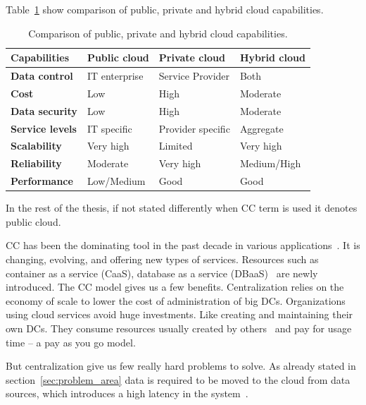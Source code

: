 Table~\ref{tab:table4} show comparison of public, private and hybrid cloud capabilities.

\begin{table}[h!]
	\begin{center}
		\begin{tabular}{l|l|l|l}
			\textbf{Capabilities} & \textbf{Public cloud} & \textbf{Private cloud} & \textbf{Hybrid cloud}\\
			\hline
			\textbf{Data control} & IT enterprise & Service Provider & Both \\
			\textbf{Cost} & Low & High & Moderate \\
			\textbf{Data security} & Low & High & Moderate \\
			\textbf{Service levels} & IT specific & Provider specific & Aggregate \\
			\textbf{Scalability} & Very high & Limited & Very high \\	
			\textbf{Reliability} & Moderate & Very high & Medium/High\\	
			\textbf{Performance} & Low/Medium & Good & Good \\
\end{tabular}
	\end{center}
	\vspace{-0.5cm}
	\caption{Comparison of public, private and hybrid cloud capabilities.}
	\label{tab:table4}
\end{table}

In the rest of the thesis, if not stated differently when CC term is used it denotes public cloud.

CC has been the dominating tool in the past decade in various applications~\cite{Satyanarayanan17}. It is changing, evolving, and offering new types of services. Resources such as container as a service (CaaS), database as a service (DBaaS)~\cite{Peter} are newly introduced. The CC model gives us a few benefits. Centralization relies on the economy of scale to lower the cost of administration of big DCs. Organizations using cloud services avoid huge investments. Like creating and maintaining their own DCs. They consume resources usually created by others~\cite{Satyanarayanan17} and pay for usage time -- a pay as you go model. 

But centralization give us few really hard problems to solve. As already stated in section~\ref{sec:problem_area} data is required to be moved to the cloud from data sources, which introduces a high latency in the system~\cite{HossainRH18}. 


